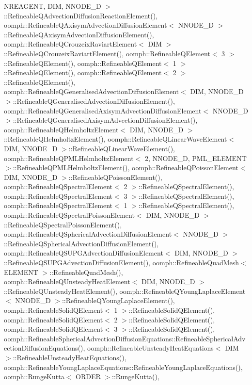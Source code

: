 N\+R\+E\+A\+G\+E\+N\+T, D\+I\+M, N\+N\+O\+D\+E\+\_\+D $>$\+::\+Refineable\+Q\+Advection\+Diffusion\+Reaction\+Element(), oomph\+::\+Refineable\+Q\+Axisym\+Advection\+Diffusion\+Element$<$ N\+N\+O\+D\+E\+\_\+D $>$\+::\+Refineable\+Q\+Axisym\+Advection\+Diffusion\+Element(), oomph\+::\+Refineable\+Q\+Crouzeix\+Raviart\+Element$<$ D\+I\+M $>$\+::\+Refineable\+Q\+Crouzeix\+Raviart\+Element(), oomph\+::\+Refineable\+Q\+Element$<$ 3 $>$\+::\+Refineable\+Q\+Element(), oomph\+::\+Refineable\+Q\+Element$<$ 1 $>$\+::\+Refineable\+Q\+Element(), oomph\+::\+Refineable\+Q\+Element$<$ 2 $>$\+::\+Refineable\+Q\+Element(), oomph\+::\+Refineable\+Q\+Generalised\+Advection\+Diffusion\+Element$<$ D\+I\+M, N\+N\+O\+D\+E\+\_\+D $>$\+::\+Refineable\+Q\+Generalised\+Advection\+Diffusion\+Element(), oomph\+::\+Refineable\+Q\+Generalised\+Axisym\+Advection\+Diffusion\+Element$<$ N\+N\+O\+D\+E\+\_\+D $>$\+::\+Refineable\+Q\+Generalised\+Axisym\+Advection\+Diffusion\+Element(), oomph\+::\+Refineable\+Q\+Helmholtz\+Element$<$ D\+I\+M, N\+N\+O\+D\+E\+\_\+D $>$\+::\+Refineable\+Q\+Helmholtz\+Element(), oomph\+::\+Refineable\+Q\+Linear\+Wave\+Element$<$ D\+I\+M, N\+N\+O\+D\+E\+\_\+D $>$\+::\+Refineable\+Q\+Linear\+Wave\+Element(), oomph\+::\+Refineable\+Q\+P\+M\+L\+Helmholtz\+Element$<$ 2, N\+N\+O\+D\+E\+\_\+D, P\+M\+L\+\_\+\+E\+L\+E\+M\+E\+N\+T $>$\+::\+Refineable\+Q\+P\+M\+L\+Helmholtz\+Element(), oomph\+::\+Refineable\+Q\+Poisson\+Element$<$ D\+I\+M, N\+N\+O\+D\+E\+\_\+D $>$\+::\+Refineable\+Q\+Poisson\+Element(), oomph\+::\+Refineable\+Q\+Spectral\+Element$<$ 2 $>$\+::\+Refineable\+Q\+Spectral\+Element(), oomph\+::\+Refineable\+Q\+Spectral\+Element$<$ 3 $>$\+::\+Refineable\+Q\+Spectral\+Element(), oomph\+::\+Refineable\+Q\+Spectral\+Element$<$ 1 $>$\+::\+Refineable\+Q\+Spectral\+Element(), oomph\+::\+Refineable\+Q\+Spectral\+Poisson\+Element$<$ D\+I\+M, N\+N\+O\+D\+E\+\_\+D $>$\+::\+Refineable\+Q\+Spectral\+Poisson\+Element(), oomph\+::\+Refineable\+Q\+Spherical\+Advection\+Diffusion\+Element$<$ N\+N\+O\+D\+E\+\_\+D $>$\+::\+Refineable\+Q\+Spherical\+Advection\+Diffusion\+Element(), oomph\+::\+Refineable\+Q\+S\+U\+P\+G\+Advection\+Diffusion\+Element$<$ D\+I\+M, N\+N\+O\+D\+E\+\_\+D $>$\+::\+Refineable\+Q\+S\+U\+P\+G\+Advection\+Diffusion\+Element(), oomph\+::\+Refineable\+Quad\+Mesh$<$ E\+L\+E\+M\+E\+N\+T $>$\+::\+Refineable\+Quad\+Mesh(), oomph\+::\+Refineable\+Q\+Unsteady\+Heat\+Element$<$ D\+I\+M, N\+N\+O\+D\+E\+\_\+D $>$\+::\+Refineable\+Q\+Unsteady\+Heat\+Element(), oomph\+::\+Refineable\+Q\+Young\+Laplace\+Element$<$ N\+N\+O\+D\+E\+\_\+D $>$\+::\+Refineable\+Q\+Young\+Laplace\+Element(), oomph\+::\+Refineable\+Solid\+Q\+Element$<$ 1 $>$\+::\+Refineable\+Solid\+Q\+Element(), oomph\+::\+Refineable\+Solid\+Q\+Element$<$ 2 $>$\+::\+Refineable\+Solid\+Q\+Element(), oomph\+::\+Refineable\+Solid\+Q\+Element$<$ 3 $>$\+::\+Refineable\+Solid\+Q\+Element(), oomph\+::\+Refineable\+Spherical\+Advection\+Diffusion\+Equations\+::\+Refineable\+Spherical\+Advection\+Diffusion\+Equations(), oomph\+::\+Refineable\+Unsteady\+Heat\+Equations$<$ D\+I\+M $>$\+::\+Refineable\+Unsteady\+Heat\+Equations(), oomph\+::\+Refineable\+Young\+Laplace\+Equations\+::\+Refineable\+Young\+Laplace\+Equations(), oomph\+::\+Runge\+Kutta$<$ O\+R\+D\+E\+R $>$\+::\+Runge\+Kutta(), 